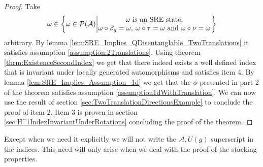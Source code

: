 \documentclass[12pt,a4paper,twoside]{article}
\let\originalleft\left
\let\originalright\right
\renewcommand{\left}{\mathopen{}\mathclose\bgroup\originalleft}
\renewcommand{\right}{\aftergroup\egroup\originalright}
\newcommand{\PP}{\mathcal P}
\renewcommand{\AA}{\mathcal A}
\theoremstyle{definition}
\numberwithin{equation}{section}
\begin{document}
\begin{proof}
	Take
	\begin{equation}
		\omega\in\left\{\omega\in\PP(\AA)\left| \begin{matrix}\omega\text{ is an SRE state,}\\\omega\circ\beta_g=\omega,\:\omega\circ\tau=\omega\text{ and }\omega\circ\nu=\omega\end{matrix} \right.\right\}
	\end{equation}
	arbitrary. By lemma \ref{lem:SRE_Implies_QDisentanglable_TwoTranslations} it satisfies assumption \ref{assumption:2Translations}. Using theorem \ref{thrm:ExistenceSecondIndex} we get that there indeed exists a well defined index that is invariant under locally generated automorphisms and satisfies item 4. By lemma \ref{lem:SRE_Implies_Assumption_1d} we get that the $\phi$ presented in part 2 of the theorem satisfies assumption \ref{assumption1dWithTranslation}. We can now use the result of section \ref{sec:TwoTranslationDirectionsExample} to conclude the proof of item 2. Item 3 is proven in section \ref{sec:H^1IndexInvariantUnderRotations} concluding the proof of the theorem.
\end{proof}
Except when we need it explicitly we will not write the $\AA,U(g)$ superscript in the indices. This need will only arise when we deal with the proof of the stacking properties.
\end{document}
